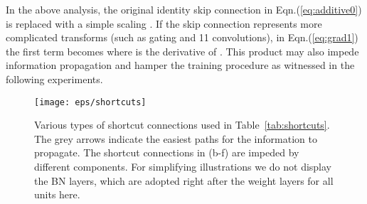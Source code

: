 \documentclass[runningheads]{llncs}
\begin{document}
In the above analysis, the original identity skip connection in Eqn.(\ref{eq:additive0}) is replaced with a simple scaling . If the skip connection  represents more complicated transforms (such as gating and 11 convolutions), in Eqn.(\ref{eq:grad1}) the first term becomes  where  is the derivative of . This product may also impede information propagation and hamper the training procedure as witnessed in the following experiments.

\begin{figure}[t]
\centering
\texttt{[image: eps/shortcuts]}
\caption{Various types of shortcut connections used in Table~\ref{tab:shortcuts}. The grey arrows indicate the easiest paths for the information to propagate. The shortcut connections in (b-f) are impeded by different components. For simplifying illustrations we do not display the BN layers, which are adopted right after the weight layers for all units here.}
\label{fig:shortcuts}
\end{figure}
\end{document}
